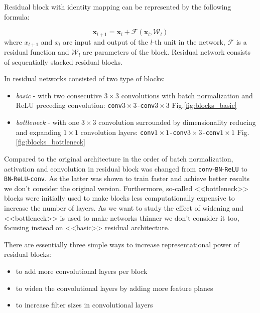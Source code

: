 \documentclass{bmvc2k}
\newcommand{\ve}[1]{\mathbf{#1}}
\begin{document}
Residual block with identity mapping can be represented by the following formula:

\begin{equation}
\ve{x}_{l+1} = \ve{x}_{l} + \mathcal{F}(\ve{x}_{l}, \mathcal{W}_l)
\end{equation}
where $x_{l+1}$ and $x_l$ are input and output of the $l$-th unit in the network, $\mathcal{F}$ is a residual function and $\mathcal{W}_l$ are parameters of the block. Residual network consists of sequentially stacked residual blocks.

In \cite{basicblock2} residual networks consisted of two type of blocks:

\begin{itemize}
  \item{\textit{basic} - with two consecutive $3\times3$ convolutions with batch normalization and ReLU preceding convolution: \texttt{conv$3\times3$-conv$3\times3$} Fig.\ref{fig:blocks_basic}}
  \item{\textit{bottleneck} - with one $3\times3$ convolution surrounded by dimensionality reducing and expanding $1\times1$ convolution layers: \texttt{conv$1\times1$-conv$3\times3$-conv$1\times1$} Fig.\ref{fig:blocks_bottleneck}}
\end{itemize}

Compared to the original architecture \cite{he2015deep} in \cite{basicblock2} the order of batch normalization, activation and convolution in residual block was changed from \texttt{conv}-\texttt{BN}-\texttt{ReLU} to \texttt{BN}-\texttt{ReLU}-\texttt{conv}. As the latter was shown to train faster and achieve better results we don't consider the original version.
Furthermore,
so-called  <<bottleneck>> blocks were initially used to make blocks less computationally expensive to increase the number of layers. As we want to study the effect of widening and <<bottleneck>> is used to make networks thinner we don't consider it too,  focusing instead on  <<basic>> residual architecture.

There are essentially three simple ways to increase representational power of residual blocks:
\vspace{-0.1cm}
\begin{itemize}
    \setlength\itemsep{-0.2em}
  \item{to add more convolutional layers per block}
  \item{to widen the convolutional layers by adding more feature planes}
  \item{to increase filter sizes in convolutional layers}
\end{itemize}
\end{document}
